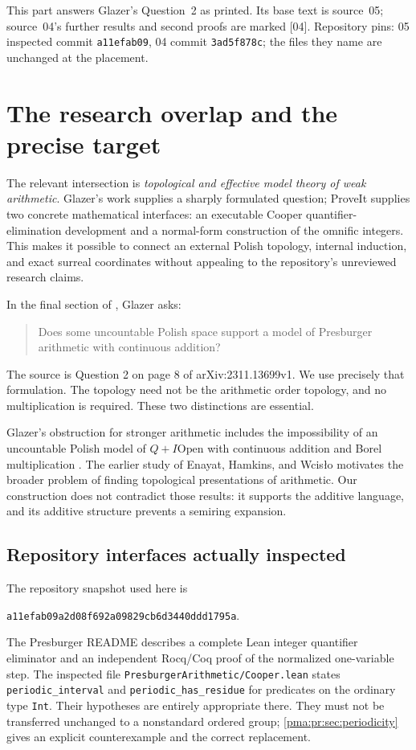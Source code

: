 \documentclass[11pt]{article}
\numberwithin{equation}{section}
\theoremstyle{definition}
\theoremstyle{remark}
\newcommand{\src}[1]{\textup{\textsf{\small[#1]}}}
\begin{document}
This part answers Glazer's Question~2 as printed. Its base text is
source~05; source~04's further results and second proofs are marked
\src{04}. Repository pins: 05 inspected commit \texttt{a11efab09}, 04 commit
\texttt{3ad5f878c}; the files they name are unchanged at the placement.

\section{The research overlap and the precise target}
\label{pma:pr:sec:overlap}

The relevant intersection is \emph{topological and effective model theory
of weak arithmetic}. Glazer's work supplies a sharply formulated question;
ProveIt supplies two concrete mathematical interfaces: an executable
Cooper quantifier-elimination development and a normal-form construction
of the omnific integers. This makes it possible to connect an external
Polish topology, internal induction, and exact surreal coordinates without
appealing to the repository's unreviewed research claims.

In the final section of \cite{Glazer}, Glazer asks:
\begin{quote}
Does some uncountable Polish space support a model of Presburger
arithmetic with continuous addition?
\end{quote}
The source is Question 2 on page 8 of arXiv:2311.13699v1. We use precisely
that formulation. The topology need not be the arithmetic order topology,
and no multiplication is required. These two distinctions are essential.

Glazer's obstruction for stronger arithmetic includes the impossibility
of an uncountable Polish model of $Q+I\mathrm{Open}$ with continuous
addition and Borel multiplication \cite[Corollary 1]{Glazer}. The earlier
study of Enayat, Hamkins, and Wcis\l o \cite{EHW} motivates the broader
problem of finding topological presentations of arithmetic. Our
construction does not contradict those results: it supports the additive
language, and its additive structure prevents a semiring expansion.

\subsection{Repository interfaces actually inspected}

The repository snapshot used here is
\begin{center}
\texttt{a11efab09a2d08f692a09829cb6d3440ddd1795a}.
\end{center}
The Presburger README \cite{RepoPresburger} describes a complete Lean
integer quantifier eliminator and an independent Rocq/Coq proof of the
normalized one-variable step. The inspected file
\texttt{PresburgerArithmetic/Cooper.lean} \cite{RepoCooper} states
\texttt{periodic\_interval} and \texttt{periodic\_has\_residue} for
predicates on the ordinary type \texttt{Int}. Their hypotheses are entirely
appropriate there. They must not be transferred unchanged to a
nonstandard ordered group; \cref{pma:pr:sec:periodicity} gives an explicit
counterexample and the correct replacement.
\end{document}

